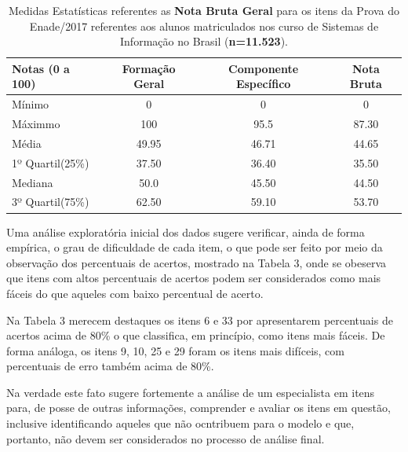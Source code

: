 \documentclass[12pt]{article}
\begin{document}
\begin{table}[htb]
	\centering
	\caption{Medidas Estatísticas referentes as \textbf{Nota Bruta Geral} para os itens da Prova do Enade/2017 referentes aos alunos matriculados nos curso de Sistemas de Informação no Brasil (\textbf{n=11.523}).}
\begin{tabular}{l|c|c|c}
\hline\hline 
    Notas (0 a 100)           &    Formação Geral    &   Componente Específico  &  Nota Bruta  \\
\hline\hline
 Mínimo            &  0      &  0                   &  0           \\
 Máximmo           &  100    &  95.5                &  87.30       \\
 Média             & 49.95   &  46.71               &  44.65       \\
 1º Quartil(25\%)  &  37.50  &  36.40               &  35.50       \\
 Mediana           &  50.0   & 45.50                &  44.50       \\
 3º Quartil(75\%)  &  62.50  &  59.10               &  53.70       \\
\hline\hline
\end{tabular}
\end{table}
\vskip0.3cm

Uma análise exploratória inicial dos dados sugere verificar, ainda de forma empírica, o grau de dificuldade de cada item, o que pode ser feito por meio da observação dos percentuais de acertos, mostrado na Tabela 3, onde se obeserva que itens com altos percentuais de acertos podem ser considerados como mais fáceis do que aqueles com baixo percentual de acerto.  \vskip0.3cm

Na Tabela 3 merecem destaques os itens 6 e 33 por apresentarem percentuais de acertos acima de 80\% o que classifica, em princípio, como itens mais fáceis. De forma análoga, os itens 9, 10, 25 e 29 foram os itens mais difíceis, com percentuais de erro também acima de 80\%.  \vskip0.3cm

Na verdade  este fato sugere fortemente a análise de um especialista em itens para, de posse de outras informações, comprender e avaliar os itens em questão, inclusive identificando aqueles que não ocntribuem para o modelo e que, portanto, não devem ser considerados no processo de análise final.
\end{document}
